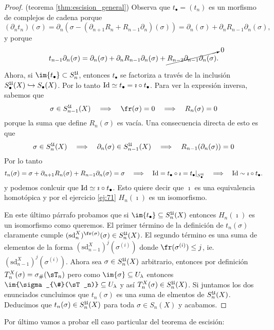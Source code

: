 \documentclass[../../topologia_algebraica]{subfiles}
\begin{document}
\begin{proof}(teorema \ref{thm:escision_general})
Observa que $t_{\bullet}=(t_n)$ es un morfismo de complejos de cadena porque
\[
  (\partial_nt_n)(\sigma)=\partial_n(\sigma-(\partial_{n+1}R_n+R_{n-1}\partial_n)(\sigma))=
  \partial_n(\sigma)+\partial_nR_{n-1}\partial_n(\sigma),
\]
y porque
\[
  t_{n-1}\partial_n(\sigma)=\partial_n(\sigma)+\partial_{n}R_{n-1}\partial_n(\sigma)+
  \cancelto{0}{R_{n-2}\partial_{n-1}\partial_n(\sigma)}.
\]

Ahora, si $\im{t_{\bullet}}\subset S_n^{\fU}$, entonces $t_{\bullet}$ se factoriza
a trav\'es de la inclusi\'on $S_{\bullet}^{\mathfrak{U}}(X)\hookrightarrow S_{\bullet}(X)$.
Por lo tanto $\text{Id}\simeq t_{\bullet}=\imath\circ t_{\bullet}$. Para ver la expresi\'on
inversa, sabemos que
\[
  \sigma\in S_{n-1}^{\fU}(X) \quad\then\quad \fr(\sigma)=0 \quad\then\quad R_n(\sigma)=0
\]
porque la suma que define $R_n(\sigma)$ es vac\'ia. Una consecuencia directa de esto
es que
\[
  \sigma\in S_n^{\mathfrak{U}}(X)\quad\Longrightarrow\quad
  \partial_{n}(\sigma)\in S_{n-1}^{\mathfrak{U}}(X)\quad\Longrightarrow\quad
  R_{n-1}(\partial_n(\sigma))=0
\]
Por lo tanto
\[
  t_{n}(\sigma)=\sigma+\partial_{n+1}R_n(\sigma)+R_{n-1}\partial_n(\sigma)=\sigma \quad\Longrightarrow\quad
  \text{Id}=t_{\bullet}\circ\imath=t_{\bullet}|_{S_{\bullet}^{\mathfrak{U}}} \quad\Longrightarrow\quad
  \text{Id}\sim\imath\circ t_{\bullet}.
\]
y podemos conlcuir que $\text{Id}\simeq \imath \circ t_{\bullet}$. Esto quiere decir que
$\imath$ es una equivalencia homot\'opica y por el ejercicio \ref{ej:71} $H_n(\imath)$
es un isomorfismo.

En este \'ultimo p\'arrafo probamos que si $\im{t_{\bullet}}\subseteq S_n^{\fU}(X)$ entonces
$H_n(\imath)$ es un isomorfismo como queremos. El primer t\'ermino de la definici\'on de
$t_n(\sigma)$ claramente cumple $(\text{sd}^X_n)^{\fr(\sigma)}(\sigma)\in S_n^{\fU}(X)$. El
segundo t\'ermino es una suma de elementos de la forma $(\text{sd}_{n-1}^X)^j(\sigma^{(i)})$
donde $\fr(\sigma^{(i)})\leq j$, ie. $(\text{sd}_{n-1}^X)^j(\sigma^{(i)})$. Ahora sea
$\sigma\in S_n^{\mathfrak{U}}(X)$ arbitrario, entonces por definici\'on $T^X_n(\sigma)=\sigma_{\#}(\sT_n)$
pero como $\im{\sigma}\subseteq U_{\la}$ entonces $\im{\sigma_{\#}(\sT_n)}\subseteq U_{\la}$
y as\'i $T^X_n(\sigma)\in S_n^{\mathfrak{U}}(X)$. Si juntamos los dos enunciados cuncluimos que
$t_n(\sigma)$ es una suma de elmentos de $S_n^{\mathfrak{U}}(X)$. Deducimos que $t_n(\sigma)\in S_n^{\mathfrak{U}}(X)$
para toda $\sigma\in S_n(X)$ y acabamos.
\end{proof}

Por \'ultimo vamos a probar ell caso particular del teorema de escisi\'on:
\end{document}
